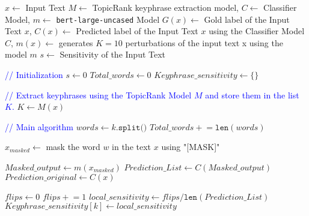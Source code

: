\begin{algorithm*}[htbp]
\begin{minipage}{\textwidth}
\begin{algorithmic}[1]
\INPUT $x \gets$ Input Text
\Require $M \gets$ TopicRank keyphrase extraction model, $C \gets$ Classifier Model, $m \gets$ \texttt{bert-large-uncased} Model 
\REPRESENTATION $G(x) \gets$ Gold label of the Input Text $x$, $C(x) \gets$ Predicted label of the Input Text $x$ using the Classifier Model $C$, $m(x) \gets$ generates $K = 10$ perturbations of the input text x using the model $m$
\OUTPUT $s \gets$ Sensitivity of the Input Text

\State \textcolor{blue}{// Initialization}
\State $s \gets 0$ \Comment{\textcolor{blue}{This variable will store the sensitivity of the input text $x$.}}
\State $Total\_words \gets 0$ \Comment{\textcolor{blue}{This variable represents the total number of words across all the keyphrases.}}
\State $Keyphrase\_sensitivity \gets \{\}$ \Comment{\textcolor{blue}{A dictionary to store the sensitivity values of each keyphrase.}}

\State \textcolor{blue}{// Extract keyphrases using the TopicRank Model $M$ and store them in the list $K$.}
\State $K \gets M(x)$

\State \textcolor{blue}{// Main algorithm}
    \State $words \gets k.\texttt{split()}$ \Comment{\textcolor{blue}{Get a list of all the words in the current keyphrase.}}
    \State $Total\_words \mathrel{+}= \texttt{len}(words)$

        \State $x_{masked} \gets$ mask the word $w$ in the text $x$ using "[MASK]"
    \EndFor

    \State $Masked\_output \gets m(x_{masked})$ \Comment{\textcolor{blue}{Store all the perturbed samples in this list.}}
    \State $Prediction\_List \gets C(Masked\_output)$ \Comment{\textcolor{blue}{Store the prediction labels of all the perturbed samples in this list.}}
    \State $Prediction\_original \gets C(x)$ \Comment{\textcolor{blue}{Store the prediction label of the input text $x$.}}

    \State $flips \gets 0$ \Comment{\textcolor{blue}{A temporary variable to count the flips.}}
            \State $flips \mathrel{+}= 1$
        \EndIf
    \EndFor
    \State $local\_sensitivity \gets flips / \texttt{len}(Prediction\_List)$ \Comment{\textcolor{blue}{Total flips normalized by the total number of labels.}}
    \State $Keyphrase\_sensitivity[k] \gets local\_sensitivity$
\EndFor


\end{algorithmic}
\end{minipage}
\end{algorithm*}
